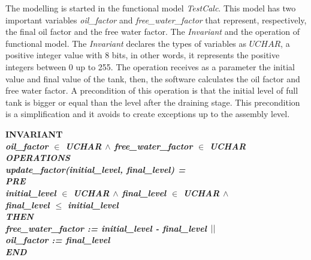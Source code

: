 \documentclass[11pt]{article} %
\begin{document}
The modelling is started in the functional model \textit{TestCalc}. This model
has two important variables \textit{oil\_factor} and \textit{free\_water\_factor}
that represent, respectively, the final oil factor and the free water factor. The
\textit{Invariant} and the operation of functional model. The \textit{Invariant}
declares the types of variables as $\mathit{UCHAR}$, a positive integer value
with 8 bits, in other words, it represents the positive integers between 0 up to
255. The operation receives as a parameter the initial value and final value of
the tank, then, the software calculates the oil factor and free water factor. A
precondition of this operation is that the initial level of full tank is bigger
or equal than the level after the draining stage. This precondition is a
simplification and it avoids to create exceptions up to the assembly level.


\small{
\begin{sloppypar}
\hspace*{-0.30in}\bf INVARIANT\\
\hspace*{0.40in}\it oil\_factor  $\in$  \it UCHAR  $\land$  \it free\_water\_factor  $\in$  \it UCHAR\\
\bf OPERATIONS\\
\hspace*{0.20in}\bf update\_factor\rm (\it initial\_level\rm , \it final\_level\rm ) \rm =\\
\hspace*{0.20in}\bf PRE\\ 
\hspace*{0.40in}\it initial\_level  $\in$  \it UCHAR  $\land$  \it final\_level\hspace*{0.10in} $\in$ 
\it UCHAR  $\land$\\
\hspace*{0.40in}\it final\_level  $\leq$  \it initial\_level\\ 
\hspace*{0.20in}\bf THEN\\
\hspace*{0.40in}\it free\_water\_factor \rm := \it initial\_level \rm - \it final\_level $\mbox{$\mid\mid$}$\\ 
\hspace*{0.40in}\it oil\_factor \rm := \it final\_level\\
\hspace*{0.20in}\bf END
\end{sloppypar}
}
\end{document}
